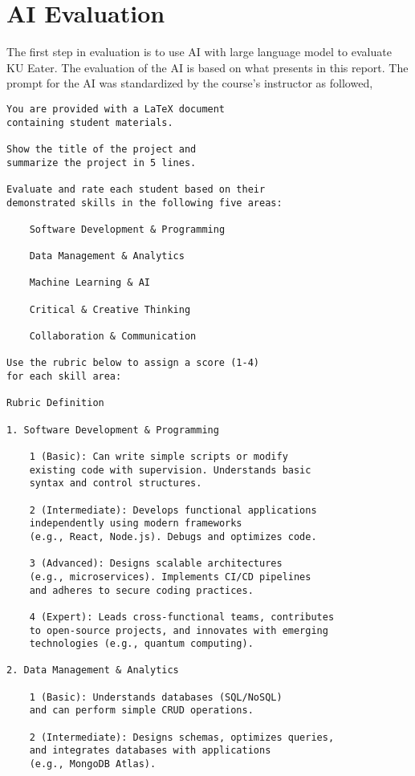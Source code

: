 \newpage

\section{AI Evaluation}
\label{section:ai-evaluation}
The first step in evaluation is to use AI with large language model to evaluate KU Eater. The evaluation of the AI is based on what
presents in this report. The prompt for the AI was standardized by the course's instructor as followed,

\begin{verbatim}
You are provided with a LaTeX document
containing student materials.

Show the title of the project and
summarize the project in 5 lines.

Evaluate and rate each student based on their
demonstrated skills in the following five areas:

    Software Development & Programming

    Data Management & Analytics

    Machine Learning & AI

    Critical & Creative Thinking

    Collaboration & Communication

Use the rubric below to assign a score (1-4)
for each skill area:

Rubric Definition

1. Software Development & Programming

    1 (Basic): Can write simple scripts or modify
    existing code with supervision. Understands basic
    syntax and control structures.

    2 (Intermediate): Develops functional applications
    independently using modern frameworks
    (e.g., React, Node.js). Debugs and optimizes code.

    3 (Advanced): Designs scalable architectures
    (e.g., microservices). Implements CI/CD pipelines
    and adheres to secure coding practices.

    4 (Expert): Leads cross-functional teams, contributes
    to open-source projects, and innovates with emerging
    technologies (e.g., quantum computing).

2. Data Management & Analytics

    1 (Basic): Understands databases (SQL/NoSQL)
    and can perform simple CRUD operations.

    2 (Intermediate): Designs schemas, optimizes queries,
    and integrates databases with applications
    (e.g., MongoDB Atlas).


\end{verbatim}
